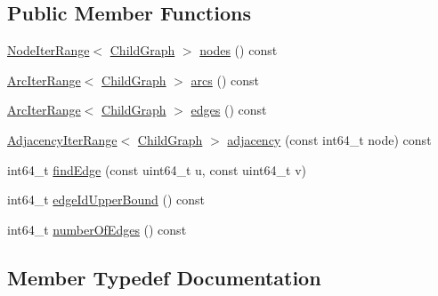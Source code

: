 \subsection*{Public Member Functions}
\begin{DoxyCompactItemize}
\item 
\hyperlink{structnifty_1_1graph_1_1DirectedGraphBase_1_1NodeIterRange}{Node\+Iter\+Range}$<$ \hyperlink{classnifty_1_1graph_1_1DirectedGraphBase_a583e01641aec296b9bc33a346f90a216}{Child\+Graph} $>$ \hyperlink{classnifty_1_1graph_1_1DirectedGraphBase_af2ea4db179032139161358e1dae678bd}{nodes} () const 
\item 
\hyperlink{structnifty_1_1graph_1_1DirectedGraphBase_1_1ArcIterRange}{Arc\+Iter\+Range}$<$ \hyperlink{classnifty_1_1graph_1_1DirectedGraphBase_a583e01641aec296b9bc33a346f90a216}{Child\+Graph} $>$ \hyperlink{classnifty_1_1graph_1_1DirectedGraphBase_ad163249d1556275cd3a26be3fb149ea2}{arcs} () const 
\item 
\hyperlink{structnifty_1_1graph_1_1DirectedGraphBase_1_1ArcIterRange}{Arc\+Iter\+Range}$<$ \hyperlink{classnifty_1_1graph_1_1DirectedGraphBase_a583e01641aec296b9bc33a346f90a216}{Child\+Graph} $>$ \hyperlink{classnifty_1_1graph_1_1DirectedGraphBase_a1c7072e651f9b4cc2c7ff121d204c8cd}{edges} () const 
\item 
\hyperlink{structnifty_1_1graph_1_1DirectedGraphBase_1_1AdjacencyIterRange}{Adjacency\+Iter\+Range}$<$ \hyperlink{classnifty_1_1graph_1_1DirectedGraphBase_a583e01641aec296b9bc33a346f90a216}{Child\+Graph} $>$ \hyperlink{classnifty_1_1graph_1_1DirectedGraphBase_a712c07401a2323f2c4df04e7c4a4ce7e}{adjacency} (const int64\+\_\+t node) const 
\item 
int64\+\_\+t \hyperlink{classnifty_1_1graph_1_1DirectedGraphBase_a49976a6e82bc84a7a2827e0e8592fc1a}{find\+Edge} (const uint64\+\_\+t u, const uint64\+\_\+t v)
\item 
int64\+\_\+t \hyperlink{classnifty_1_1graph_1_1DirectedGraphBase_a51b3ede5d781b372911dad0cff2ae6f6}{edge\+Id\+Upper\+Bound} () const 
\item 
int64\+\_\+t \hyperlink{classnifty_1_1graph_1_1DirectedGraphBase_ad3e9b4a5e810cdfb87bdff0adf3385d4}{number\+Of\+Edges} () const 
\end{DoxyCompactItemize}


\subsection{Member Typedef Documentation}
\hypertarget{classnifty_1_1graph_1_1DirectedGraphBase_a583e01641aec296b9bc33a346f90a216}{}
